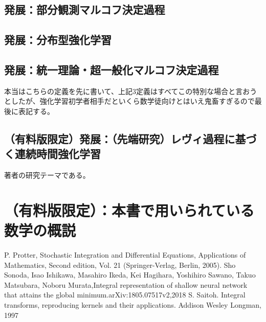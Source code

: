 \documentclass{jsarticle}
\begin{document}
\subsection{発展：部分観測マルコフ決定過程}




\subsection{発展：分布型強化学習}


\subsection{発展：統一理論・超一般化マルコフ決定過程}
本当はこちらの定義を先に書いて、上記3定義はすべてこの特別な場合と言おうとしたが、強化学習初学者相手だといくら数学徒向けとはいえ鬼畜すぎるので最後に表記する。


\subsection{（有料版限定）発展：（先端研究）レヴィ過程に基づく連続時間強化学習}
著者の研究テーマである。

\newpage
\section{（有料版限定）：本書で用いられている数学の概説}



\newpage
\newpage
\begin{thebibliography}{99}
    P. Protter, Stochastic Integration and Differential Equations, Applications of Mathematics, Second edition, Vol. 21 (Springer-Verlag, Berlin, 2005).
     Sho Sonoda, Isao Ishikawa, Masahiro Ikeda, Kei Hagihara, Yoshihiro Sawano, Takuo Matsubara, Noboru Murata,Integral representation of shallow neural network that attains the global minimum.arXiv:1805.07517v2,2018
     S. Saitoh. Integral transforms, reproducing kernels and their applications. Addison Wesley Longman, 1997
  
\end{thebibliography}
\end{document}
